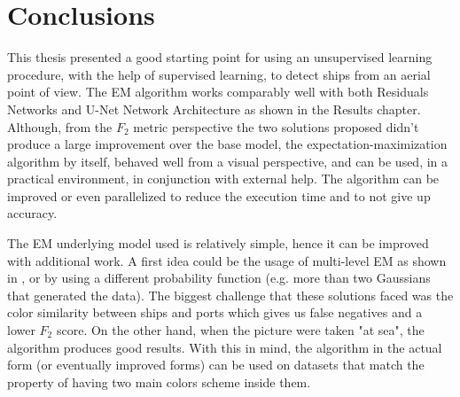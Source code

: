 \chapter{Conclusions}
This thesis presented a good starting point for using an unsupervised learning procedure, with the help of supervised learning, to detect ships from an aerial point of view. The EM algorithm works comparably well with both Residuals Networks and U-Net Network Architecture as shown in the Results chapter. Although, from the $F_2$ metric perspective the two solutions proposed didn't produce a large improvement over the base model, the expectation-maximization algorithm by itself, behaved well from a visual perspective, and can be used, in a practical environment, in conjunction with external help. The algorithm can be improved or even parallelized to reduce the execution time and to not give up accuracy.

The EM underlying model used is relatively simple, hence it can be improved with additional work. A first idea could be the usage of multi-level EM as shown in \cite{EMObjectConcealement}, or by using a different probability function (e.g. more than two Gaussians that generated the data). The biggest challenge that these solutions faced was the color similarity between ships and ports which gives us false negatives and a lower $F_2$ score. On the other hand, when the picture were taken "at sea", the algorithm produces good results. With this in mind, the algorithm in the actual form (or eventually improved forms) can be used on datasets that match the property of having two main colors scheme inside them.
